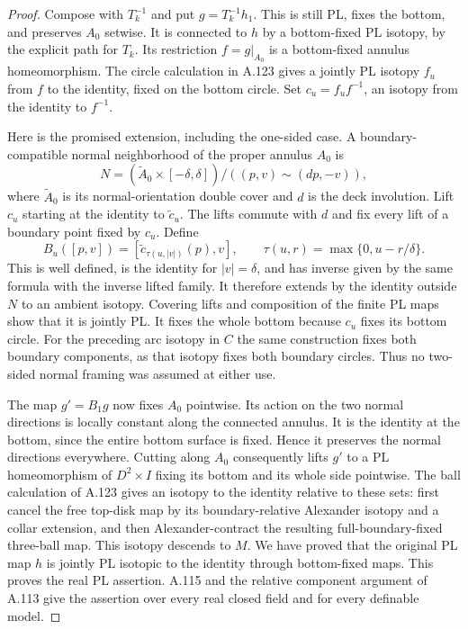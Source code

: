 \begin{proof}
Compose with $T_k^{-1}$ and put $g=T_k^{-1}h_1$. This is still PL,
fixes the bottom, and preserves $A_0$ setwise. It is connected to
$h$ by a bottom-fixed PL isotopy, by the explicit path for $T_k$.
Its restriction $f=g|_{A_0}$ is a bottom-fixed annulus
homeomorphism. The circle calculation in A.123 gives a jointly PL
isotopy $f_u$ from $f$ to the identity, fixed on the bottom circle.
Set $c_u=f_uf^{-1}$, an isotopy from the identity to $f^{-1}$.

Here is the promised extension, including the one-sided case.
A boundary-compatible normal neighborhood of the proper annulus
$A_0$ is
\[
 N=(\widetilde A_0\times[-\delta,\delta])/
       ((p,v)\sim(dp,-v)),
\]
where $\widetilde A_0$ is its normal-orientation double cover and
$d$ is the deck involution. Lift $c_u$ starting at the identity to
$\widetilde c_u$. The lifts commute with $d$ and fix every lift
of a boundary point fixed by $c_u$. Define
\[
 B_u([p,v])=
 \left[\widetilde c_{\tau(u,|v|)}(p),v\right],\qquad
 \tau(u,r)=\max\{0,u-r/\delta\}.                    \tag{A.127.2}
\]
This is well defined, is the identity for $|v|=\delta$, and has
inverse given by the same formula with the inverse lifted family.
It therefore extends by the identity outside $N$ to an ambient
isotopy. Covering lifts and composition of the finite PL maps show
that it is jointly PL. It fixes the whole bottom because $c_u$
fixes its bottom circle. For the preceding arc isotopy in $C$ the
same construction fixes both boundary components, as that isotopy
fixes both boundary circles. Thus no two-sided normal framing was
assumed at either use.

The map $g'=B_1g$ now fixes $A_0$ pointwise. Its action on the two
normal directions is locally constant along the connected annulus.
It is the identity at the bottom, since the entire bottom surface
is fixed. Hence it preserves the normal directions everywhere.
Cutting along $A_0$ consequently lifts $g'$ to a PL homeomorphism
of $D^2\times I$ fixing its bottom and its whole side pointwise.
The ball calculation of A.123 gives an isotopy to the identity
relative to these sets: first cancel the free top-disk map by its
boundary-relative Alexander isotopy and a collar extension, and
then Alexander-contract the resulting full-boundary-fixed
three-ball map. This isotopy descends to $M$. We have proved that
the original PL map $h$ is jointly PL isotopic to the identity through
bottom-fixed maps. This proves the real PL assertion. A.115 and the
relative component argument of A.113 give the assertion over every
real closed field and for every definable model.


\end{proof}
